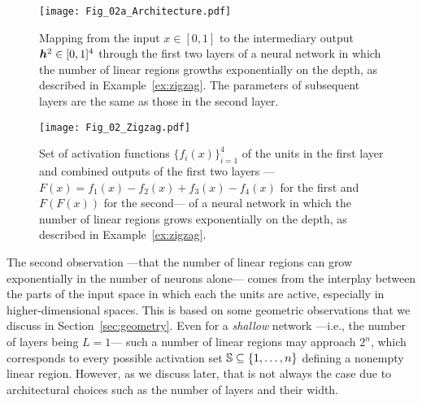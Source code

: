 \begin{figure}[h!]
    \centering
    \texttt{[image: Fig\_02a\_Architecture.pdf]}
    \caption{Mapping from the input $x \in [0,1]$ to the intermediary output ${\bm{h}}^2 \in [0,1]^{4}$ through the first two layers of a neural network in which the number of linear regions growths exponentially on the depth, as described in Example~\ref{ex:zigzag}. 
    The parameters of subsequent layers are the same as those in the second layer.}
    \label{fig:architecture_zigzag}
\end{figure}

\begin{figure}[h!]
    \centering
    \texttt{[image: Fig\_02\_Zigzag.pdf]}
    \caption{Set of activation functions $\{ f_i(x) \}_{i=1}^4$ of the units in the first layer and combined outputs of the first two layers ---$F(x) = f_1(x) - f_2(x) + f_3(x) - f_4(x)$ for the first and $F(F(x))$ for the second--- of a neural network in which the number of linear regions grows exponentially on the depth, as described in Example~\ref{ex:zigzag}.}
    \label{fig:zigzag}
\end{figure}

The second observation ---that the number of linear regions can grow exponentially in the number of neurons alone--- comes from the interplay between the parts of the input space in which each the units are active, 
especially in higher-dimensional spaces. 
This is based on some geometric observations that we discuss in Section~\ref{sec:geometry}. 
Even for a \emph{shallow} network ---i.e., the number of layers being $L=1$--- such a number of linear regions may approach $2^n$, 
which corresponds to every possible activation set ${\mathbb{S}} \subseteq \{1, \ldots, n\}$ defining a nonempty linear region. 
However, as we discuss later, that is not always the case due to architectural choices such as the number of layers and their width.

 



